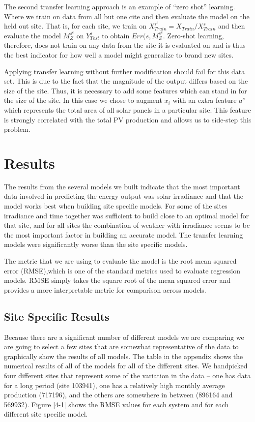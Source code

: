 \documentclass[11pt, fullpage,letterpaper]{article}
\begin{document}
The second transfer learning approach is an example of “zero shot” learning. Where we train on data from all but one cite and then evaluate the model on the held out site. That is, for each site, we train on $X^{s^c}_{Train} = X_{Train} / X^s_{Train}$ and then evaluate the model $M^{s^c}_Z$ on $Y^s_{Test}$ to obtain $Err(s, M^{s^c}_Z$. Zero-shot learning, therefore, does not train on any data from the site it is evaluated on and is thus the best indicator for how well a model might generalize to brand new sites.

Applying transfer learning without further modification should fail for this data set. This is due to the fact that the magnitude of the output differs based on the size of the site. Thus, it is necessary to add some features which can stand in for the size of the site. In this case we chose to augment $x_i$ with an extra feature $a^s$ which represents the total area of all solar panels in a particular site. This feature is strongly correlated with the total PV production and allows us to side-step this problem.

\section{Results}

The results from the several models we built indicate that the most important data involved in predicting the energy output was solar irradiance and that the model works best when building site specific models. For some of the sites irradiance and time together was sufficient to build close to an optimal model for that site, and for all sites the combination of weather with irradiance seems to be the most important factor in building an accurate model. The transfer learning models were significantly worse than the site specific models.

The metric that we are using to evaluate the model is the root mean squared error (RMSE),which is one of the standard metrics used to evaluate regression models. RMSE simply takes the square root of the mean squared error and provides a more interpretable metric for comparison across models.

\subsection{Site Specific Results}

Because there are a significant number of different models we are comparing we are going to select a few sites that are somewhat representative of the data to graphically show the results of all models. The table in the appendix shows the numerical results of all of the models for all of the different sites. We handpicked four different sites that represent some of the variation in the data – one has data for a long period (site 103941), one has a relatively high monthly average production (717196), and the others are somewhere in between (896164 and 569932). Figure \ref{4-1} shows the RMSE values for each system and for each different site specific model. 
\end{document}
